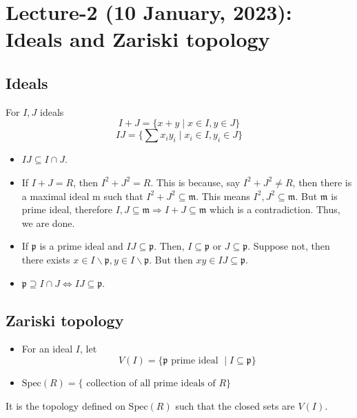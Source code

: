 \documentclass[oneside, 12pt, ]{scrbook}
\theoremstyle{theorem}
\begin{document}
\chapter{Lecture-2 (10 January, 2023): Ideals and Zariski topology}

\section{Ideals}
For $I,J$ ideals $$I+J = \{x+y \mid x\in I, y\in J\}$$ $$IJ = \{\sum x_{i}y_{i} \mid x_{i} \in I, y_{i} \in J\}$$

\begin{itemize}
\item $IJ \subseteq I \cap J$.
\item If $I+J = R$, then $I^2 + J^2 = R$. This is because, say $I^2 + J^2 \neq R$, then there is a maximal ideal $\mathrm{m}$ such that $I^2 + J^2 \subseteq \mathfrak{m}$. This means $I^2, J^2 \subseteq \mathfrak{m}$. But $\mathfrak{m}$ is prime ideal, therefore $I,J \subseteq \mathfrak{m} \Rightarrow I+J \subseteq \mathfrak{m}$ which is a contradiction. Thus, we are done. 
\item If $\mathfrak{p}$ is a prime ideal and $IJ \subseteq \mathfrak{p}$. Then, $I \subseteq \mathfrak{p}$ or $J \subseteq \mathfrak{p}$. Suppose not, then there exists $x \in I \backslash \mathfrak{p} , y \in I \backslash \mathfrak{p}$. But then $xy \in IJ \subseteq \mathfrak{p}$.
\item $\mathfrak{p} \supseteq I \cap J \Leftrightarrow IJ \subseteq \mathfrak{p}$.
\end{itemize}

\section{Zariski topology}

\begin{definition}
\begin{itemize}
\item For an ideal $I$, let $$V(I) = \{\mathfrak{p} \text{ prime ideal }\mid I \subseteq \mathfrak{p}\}$$
\item $\mathrm{Spec}(R)=\{ \text{ collection of all prime ideals of }R\}$
\end{itemize}
\end{definition}

\begin{definition}
It is the topology defined on $\mathrm{Spec}(R)$ such that the closed sets are $V(I)$.
\end{definition}
\end{document}

